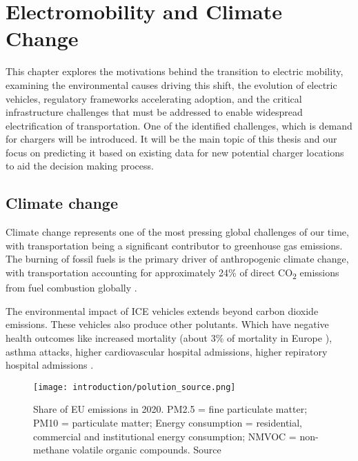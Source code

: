 
\setchapterpreamble[u]{\margintoc}
\chapter{Electromobility and Climate Change}

This chapter explores the motivations behind the transition to electric mobility, examining the environmental causes driving this shift, the evolution of electric vehicles, regulatory frameworks accelerating adoption, and the critical infrastructure challenges that must be addressed to enable widespread electrification of transportation. One of the identified challenges, which is demand for chargers will be introduced. It will be the main topic of this thesis and our focus on predicting it based on existing data for new potential charger locations to aid the decision making process.


\section{Climate change}

Climate change represents one of the most pressing global challenges of our time, with transportation being a significant contributor to greenhouse gas emissions. The burning of fossil fuels is the primary driver of anthropogenic climate change, with transportation accounting for approximately 24\% of direct CO\textsubscript{2} emissions from fuel combustion globally \cite{quadrelliEnergyClimateChallenge2007}.

The environmental impact of ICE vehicles extends beyond carbon dioxide emissions. These vehicles also produce other polutants. Which have negative health outcomes like increased mortality (about 3\% of mortality in Europe \cite{kunzliPublichealthImpactOutdoor2000}), asthma attacks, higher cardiovascular hospital admissions, higher repiratory hospital admissions \cite{kunzliHealthCostsDue1999}.

\begin{figure}[h]
    \centering
    \texttt{[image: introduction/polution\_source.png]}
    \label{fig:polution_source}
    \caption{Share of EU emissions in 2020. PM2.5 = fine particulate matter; PM10 = particulate matter; Energy consumption = residential, commercial and institutional energy consumption; NMVOC = non-methane volatile organic compounds. Source \cite{ContributionsEU27Emissions2022}}
\end{figure}

